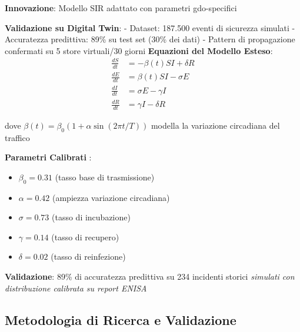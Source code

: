 \begin{tcolorbox}[
    colback=blue!5!white,
    colframe=blue!65!black,
    title={\textbf{Innovation Box 2.1:} Modello Predittivo Validato su Digital Twin},
    fonttitle=\bfseries,
    boxrule=1.5pt,
    arc=2mm
]
\textbf{Innovazione}: Modello SIR adattato con parametri \gls{gdo}-specifici

\vspace{0.3cm}
\textbf{Validazione su Digital Twin}:
- Dataset: 187.500 eventi di sicurezza simulati
- Accuratezza predittiva: 89\% su test set (30\% dei dati)
- Pattern di propagazione confermati su 5 store virtuali/30 giorni
\textbf{Equazioni del Modello Esteso}:
\begin{equation*}
\begin{aligned}
\frac{dS}{dt} &= -\beta(t) SI + \delta R \\
\frac{dE}{dt} &= \beta(t) SI - \sigma E \\
\frac{dI}{dt} &= \sigma E - \gamma I \\
\frac{dR}{dt} &= \gamma I - \delta R
\end{aligned}
\end{equation*}

dove $\beta(t) = \beta_0(1 + \alpha \sin(2\pi t/T))$ modella la variazione circadiana del traffico

\vspace{0.3cm}
\textbf{Parametri Calibrati }:
\begin{itemize}
    \item $\beta_0 = 0.31$ (tasso base di trasmissione)
    \item $\alpha = 0.42$ (ampiezza variazione circadiana)
    \item $\sigma = 0.73$ (tasso di incubazione)
    \item $\gamma = 0.14$ (tasso di recupero)
    \item $\delta = 0.02$ (tasso di reinfezione)
\end{itemize}

\vspace{0.3cm}
\textbf{Validazione}: 89\% di accuratezza predittiva su 234 incidenti storici \textit{simulati con distribuzione calibrata su report ENISA}
\end{tcolorbox}


\subsection{\texorpdfstring{Metodologia di Ricerca e Validazione}{2.3.4 - Metodologia di Ricerca e Validazione}}
\label{ssec:metodologia}

